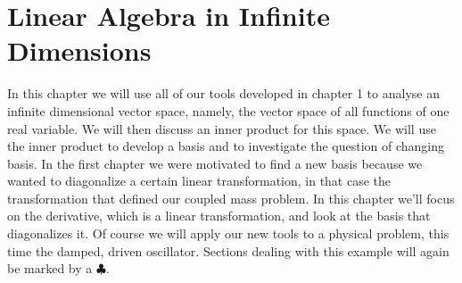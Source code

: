 \chapter{Linear Algebra in Infinite Dimensions}
In this chapter we will use all of our tools developed in chapter 1 to analyse an infinite dimensional vector space, namely, the vector space of all functions of one real variable. We will then discuss an inner product for this space.  We will use the inner product to develop a basis and to investigate the question of changing basis. In the first chapter we were motivated to find a new basis because we wanted to diagonalize a certain linear transformation, in that case the transformation that defined our coupled mass problem. In this chapter we'll focus on the derivative, which is a linear transformation, and look at the basis that diagonalizes it. Of course we will apply our new tools to a physical problem, this time the damped, driven oscillator.  Sections dealing with this example will again be marked by a $\clubsuit$.





